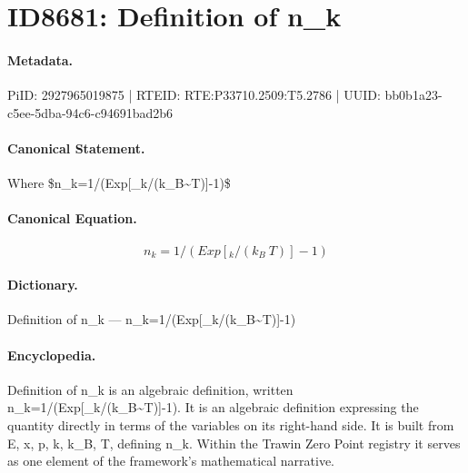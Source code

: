 \section*{ID8681: Definition of n\_k}
\paragraph{Metadata.}
PiID: 2927965019875 | RTEID: RTE:P33710.2509:T5.2786 | UUID: bb0b1a23-c5ee-5dba-94c6-c94691bad2b6

\paragraph{Canonical Statement.}
Where \$n\_k=1/(Exp[\_k/(k\_B\textasciitilde{}T)]-1)\$

\paragraph{Canonical Equation.}
\[
n_k=1/(Exp[_k/(k_B~T)]-1)
\]

\paragraph{Dictionary.}
Definition of n\_k — n\_k=1/(Exp[\_k/(k\_B\textasciitilde{}T)]-1)

\paragraph{Encyclopedia.}
Definition of n\_k is an algebraic definition, written n\_k=1/(Exp[\_k/(k\_B\textasciitilde{}T)]-1). It is an algebraic definition expressing the quantity directly in terms of the variables on its right-hand side. It is built from E, x, p, k, k\_B, T, defining n\_k. Within the Trawin Zero Point registry it serves as one element of the framework's mathematical narrative.

